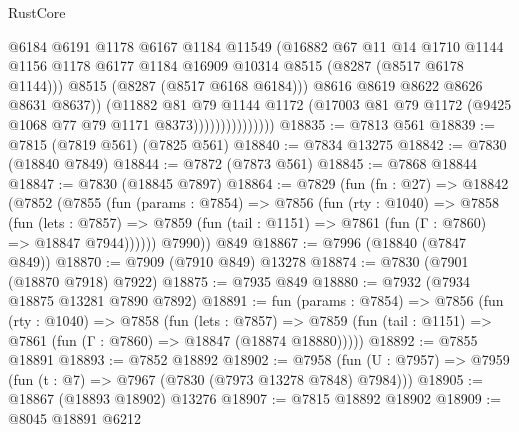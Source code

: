 \begin{lexlean}{RustCore}
\begin{coremodule}
                                  @6184
                                  @6191
                                  @1178
                                  @6167
                                  @1184
                                  @11549
                                  (@16882
                                    @67
                                    @11
                                    @14
                                    @1710
                                    @1144
                                    @1156
                                    @1178
                                    @6177
                                    @1184
                                    @16909
                                    @10314
                                    @8515
                                    (@8287 (@8517 @6178 @1144)))
                                  @8515
                                  (@8287 (@8517 @6168 @6184)))
                                @8616
                                @8619
                                @8622
                                @8626
                                @8631
                                @8637))
                            (@11882
                              @81
                              @79
                              @1144
                              @1172
                              (@17003 @81 @79 @1172 (@9425 @1068 @77 @79 @1171 @8373)))))))))))))))
@18835 := @7813 @561
@18839 := @7815 (@7819 @561) (@7825 @561)
@18840 := @7834 @13275
@18842 := @7830 (@18840 @7849)
@18844 := @7872 (@7873 @561)
@18845 := @7868 @18844
@18847 := @7830 (@18845 @7897)
@18864 := @7829
    (fun (fn : @27) =>
    @18842
      (@7852
        (@7855
          (fun (params : @7854) =>
          @7856
            (fun (rty : @1040) =>
            @7858
              (fun (lets : @7857) =>
              @7859 (fun (tail : @1151) => @7861 (fun (Γ : @7860) => @18847 @7944))))))
        @7990))
    @849
@18867 := @7996 (@18840 (@7847 @849))
@18870 := @7909 (@7910 @849) @13278
@18874 := @7830 (@7901 (@18870 @7918) @7922)
@18875 := @7935 @849
@18880 := @7932 (@7934 @18875 @13281 @7890 @7892)
@18891 := fun (params : @7854) =>
  @7856
    (fun (rty : @1040) =>
    @7858
      (fun (lets : @7857) =>
      @7859 (fun (tail : @1151) => @7861 (fun (Γ : @7860) => @18847 (@18874 @18880)))))
@18892 := @7855 @18891
@18893 := @7852 @18892
@18902 := @7958
    (fun (U : @7957) => @7959 (fun (t : @7) => @7967 (@7830 (@7973 @13278 @7848) @7984)))
@18905 := @18867 (@18893 @18902) @13276
@18907 := @7815 @18892 @18902
@18909 := @8045 @18891 @6212

\end{coremodule}
\end{lexlean}
